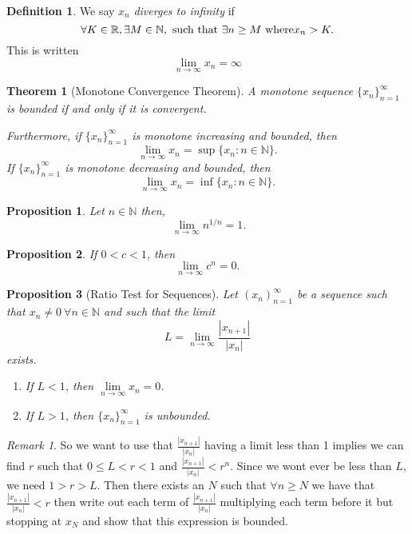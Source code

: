 \documentclass{article}
\newtheorem{theorem}{Theorem}[section]
\newtheorem{proposition}{Proposition}[section]
\theoremstyle{definition}
\newtheorem{definition}{Definition}[section]
\theoremstyle{remark}
\newtheorem{remark}{Remark}[section]
\begin{document}
\begin{definition}\label{def:divergent sequence}
We say \(x_n\) \textit{diverges to infinity} if
\[
\forall K \in \mathbb{R}, \exists M \in \mathbb{N}, \textnormal{ such that } \exists n \geq  M \textnormal{ where} x_n > K.
\]
This is written
\[
\lim_{n \to \infty}{x_n} = \infty
\]
\end{definition}



\begin{theorem}[Monotone Convergence Theorem] \label{thm: monotone convergence theorem}
A monotone sequence \(\{x_n\}_{n=1}^{\infty}\) is bounded if and only if it is convergent.

\textit{Furthermore, if} \(\{x_n\}_{n=1}^{\infty}\) \textit{is monotone increasing and bounded, then}
\[
\lim_{n \to \infty} x_n = \sup \{x_n : n \in \mathbb{N} \}.
\]
\textit{If} \(\{x_n\}_{n=1}^{\infty}\) \textit{is monotone decreasing and bounded, then}
\[
\lim_{n \to \infty} x_n = \inf \{x_n : n \in \mathbb{N} \}.
\]
\end{theorem}





\begin{proposition} \label{ex: nth root limit}
Let \(n \in \mathbb{N}\) then,
\[
\ \lim_{n \to \infty}{n^{1/n}} = 1.
\]
\end{proposition}




\begin{proposition} \label{ex: limit of c^n}
If $0<c<1$, then 
\[
\lim_{n \to \infty} c^n = 0.
\]
\end{proposition}




\begin{proposition}[Ratio Test for Sequences] \label{ex:ratio_test}
Let \( (x_n)_{n=1}^{\infty} \) be a sequence such that \( x_n \neq 0 \ \forall n \in \mathbb{N}\) and such that the limit
\[
L = \lim_{n \to \infty} \frac{|x_{n+1}|}{|x_n|}
\]
exists.
\begin{enumerate}
\item If \( L < 1 \), then \( \lim\limits_{n\to\infty} x_n = 0 \).
\item If \( L > 1 \), then \( \{x_n\}_{n=1}^{\infty} \) is unbounded.
\end{enumerate}
\end{proposition}
\begin{remark}
So we want to use that $\frac{|x_{n+1}|}{|x_n|}$ having a limit less than 1
implies we can find $r$ such that $0 \leq L<r<1$ and $\frac{|x_{n+1}|}{|x_n|} < r^n$.
Since we wont ever be less than $L$, we need $1>r>L$. Then there exists 
an $N$ such that $\forall n\geq N$ we have that $\frac{|x_{n+1}|}{|x_n|} < r$ then write out
each term of $\frac{|x_{n+1}|}{|x_n|}$ multiplying each term before it but stopping at $x_N$ and show that this 
expression is bounded.
\end{remark}
\end{document}
